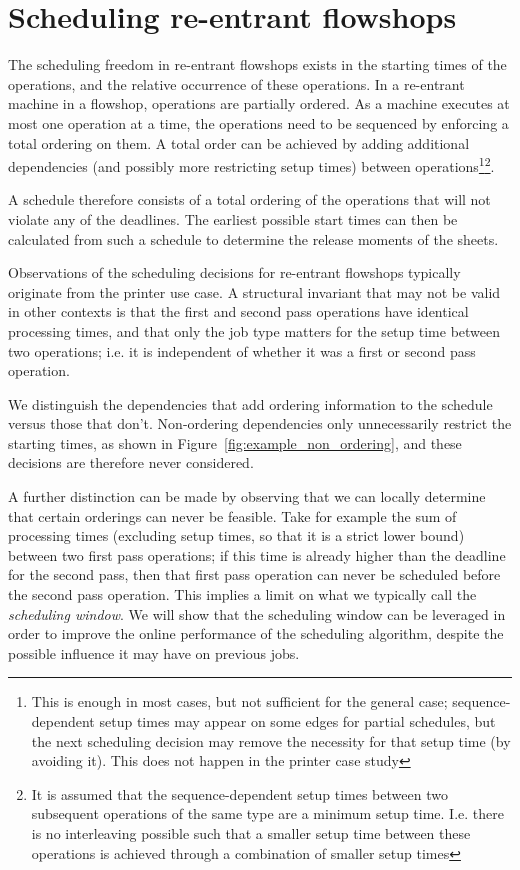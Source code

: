 \documentclass[]{article}
\begin{document}
\section{Scheduling re-entrant flowshops}
The scheduling freedom in re-entrant flowshops exists in the starting times of the operations, and the relative occurrence of these operations. In a re-entrant machine in a flowshop, operations are partially ordered. As a machine executes at most one operation at a time, the operations need to be sequenced by enforcing a total ordering on them. A total order can be achieved by adding additional dependencies (and possibly more restricting setup times) between operations\footnote{This is enough in most cases, but not sufficient for the general case; sequence-dependent setup times may appear on some edges for partial schedules, but the next scheduling decision may remove the necessity for that setup time (by avoiding it). This does not happen in the printer case study}\footnote{It is assumed that the sequence-dependent setup times between two subsequent operations of the same type are a minimum setup time. I.e. there is no interleaving possible such that a smaller setup time between these operations is achieved through a combination of smaller setup times}. 

A schedule therefore consists of a total ordering of the operations that will not violate any of the deadlines. The earliest possible start times can then be calculated from such a schedule to determine the release moments of the sheets. 

Observations of the scheduling decisions for re-entrant flowshops typically originate from the printer use case. A structural invariant that may not be valid in other contexts is that the first and second pass operations have identical processing times, and that only the job type matters for the setup time between two operations; i.e. it is independent of whether it was a first or second pass operation.

We distinguish the dependencies that add ordering information to the schedule versus those that don't. Non-ordering dependencies only unnecessarily restrict the starting times, as shown in Figure~\ref{fig:example_non_ordering}, and these decisions are therefore never considered.

A further distinction can be made by observing that we can locally determine that certain orderings can never be feasible. Take for example the sum of processing times (excluding setup times, so that it is a strict lower bound) between two first pass operations; if this time is already higher than the deadline for the second pass, then that first pass operation can never be scheduled before the second pass operation. This implies a limit on what we typically call the {\it{scheduling window}}. We will show that the scheduling window can be leveraged in order to improve the online performance of the scheduling algorithm, despite the possible influence it may have on previous jobs.
\end{document}
